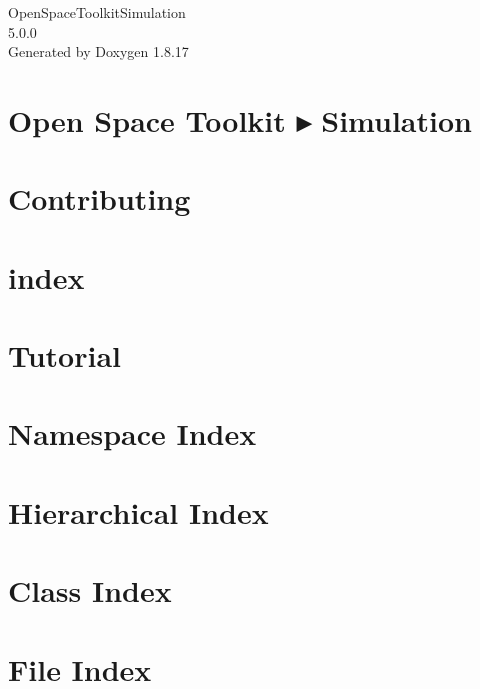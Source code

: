 \let\mypdfximage\pdfximage\def\pdfximage{\immediate\mypdfximage}\documentclass[twoside]{book}
\newcommand{\+}{\discretionary{\mbox{\scriptsize$\hookleftarrow$}}{}{}}
\newcommand{\clearemptydoublepage}{%
  \newpage{\pagestyle{empty}\cleardoublepage}%
}
\begin{document}
\hypersetup{pageanchor=false,
             bookmarksnumbered=true,
             pdfencoding=unicode
            }
\begin{titlepage}
\vspace*{7cm}
\begin{center}%
{\Large Open\+Space\+Toolkit\+Simulation \\[1ex]\large 5.\+0.\+0 }\\
\vspace*{1cm}
{\large Generated by Doxygen 1.8.17}\\
\end{center}
\end{titlepage}
\clearemptydoublepage
{}
\tableofcontents
\clearemptydoublepage
{}
\hypersetup{pageanchor=true}

\chapter{Open Space Toolkit ▸ Simulation}
\label{index}\hypertarget{index}{}
\chapter{Contributing}
\label{md__c_o_n_t_r_i_b_u_t_i_n_g}

\chapter{index}
\label{md_docs_index}

\chapter{Tutorial}
\label{md_docs__tutorial}

\chapter{Namespace Index}

\chapter{Hierarchical Index}

\chapter{Class Index}

\chapter{File Index}

\end{document}
